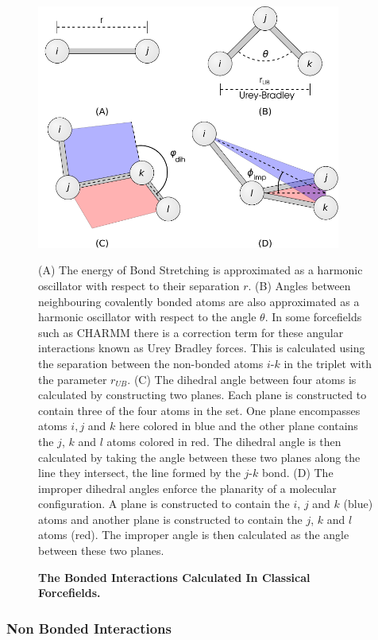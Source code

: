 \begin{figure}[H]
	\begin{center}
	\includegraphics[width=10cm]{figures/bonded_interactions.pdf}
	\end{center}
	\captionsetup{singlelinecheck = false, justification=raggedright}
	\caption[The Bonded Interactions Calculated In Classical Forcefields]{\textbf{The Bonded Interactions Calculated In Classical Forcefields.}}{
	(A) The energy of Bond Stretching is approximated as a harmonic oscillator with respect to their separation $r$. (B) Angles between neighbouring covalently bonded atoms are also approximated as a harmonic oscillator with respect to the angle $\theta$. In some forcefields such as CHARMM there is a correction term for these angular interactions known as Urey Bradley forces. This is calculated using the separation between the non-bonded atoms $i$-$k$ in the triplet with the parameter $r_{UB}$. (C) The dihedral angle between four atoms is calculated by constructing two planes. Each plane is constructed to contain three of the four atoms in the set. One plane encompasses atoms $i, j$ and $k$ here colored in blue and the other plane contains the $j$, $k$ and $l$ atoms colored in red. The dihedral angle is then calculated by taking the angle between these two planes along the line they intersect, the line formed by the $j$-$k$ bond. (D) The improper dihedral angles enforce the planarity of a molecular configuration. A plane is constructed to contain the $i$, $j$ and $k$ (blue) atoms and another plane is constructed to contain the $j$, $k$ and $l$ atoms (red). The improper angle is then calculated as the angle between these two planes. }
	\label{charmm_bonded}
\end{figure}

\subsubsection{Non Bonded Interactions}

